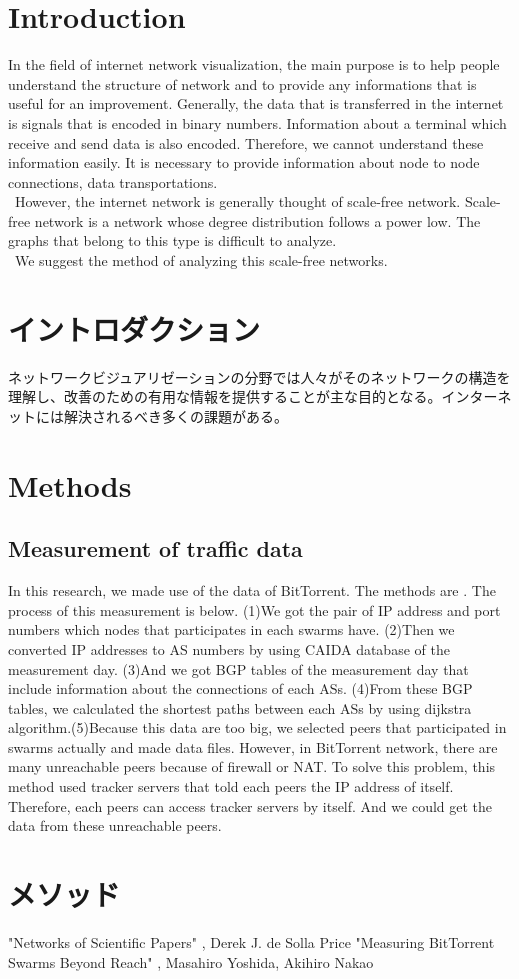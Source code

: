 \documentclass{jsarticle}
\begin{document}
\section{Introduction}
In the field of internet network visualization, the main purpose is to help people understand the structure of network and to provide any informations that is useful for an improvement. Generally, the data that is transferred in the internet is signals that is encoded in binary numbers. Information about a terminal which receive and send data is also encoded. Therefore, we cannot understand these information easily. It is necessary to provide information about node to node connections, data transportations.\\
\ However, the internet network is generally thought of scale-free network. Scale-free network is 
a network whose degree distribution follows a power low. \cite{scale-free} The graphs that belong to this type is difficult to analyze. \\
\ We suggest the method of analyzing this scale-free networks. 
\newpage
\section{イントロダクション}
ネットワークビジュアリゼーションの分野では人々がそのネットワークの構造を理解し、改善のための有用な情報を提供することが主な目的となる。インターネットには解決されるべき多くの課題がある。

\twocolumn
\newpage
\section{Methods}
\subsection{Measurement of traffic data}
In this research, we made use of the data of BitTorrent. The methods are  \cite{BitTorrent}. The process of this measurement is below. (1)We got the pair of IP address and port numbers which nodes that participates in each swarms have. (2)Then we converted IP addresses to AS numbers by using CAIDA database of the measurement day. (3)And we got BGP tables of the measurement day that include information about the connections of each ASs. (4)From these BGP tables, we calculated the shortest paths between each ASs by using dijkstra algorithm.(5)Because this data are too big, we selected peers that participated in swarms actually and made data files. However, in BitTorrent network, there are many unreachable peers because of firewall or NAT. To solve this problem, this method used tracker servers that told each peers the IP address of itself. Therefore, each peers can access tracker servers by itself. And we could get the data from these unreachable peers.
\newpage
\section{メソッド}
\newpage

\onecolumn
\begin{thebibliography}{9}
 "Networks of Scientific Papers" , Derek J. de Solla Price
 "Measuring BitTorrent Swarms Beyond Reach" , Masahiro Yoshida, Akihiro Nakao
\end{thebibliography}
\end{document}
